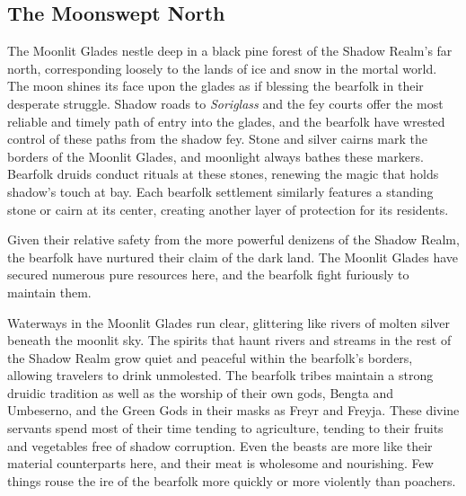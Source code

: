 \documentclass[10pt,a4paper,twoside,bg=print,twocolumn,openany,nodeprecatedcode]{dndbook}
\begin{document}
\subsection{The Moonswept North}
The Moonlit Glades nestle deep in a black pine forest of the Shadow Realm's far north, corresponding loosely to the lands of ice and snow in the mortal world. The moon shines its face upon the glades as if blessing the bearfolk in their desperate struggle. Shadow roads to \textit{Soriglass} and the fey courts offer the most reliable and timely path of entry into the glades, and the bearfolk have wrested control of these paths from the shadow fey. Stone and silver cairns mark the borders of the Moonlit Glades, and moonlight always bathes these markers. Bearfolk druids conduct rituals at these stones, renewing the magic that holds shadow's touch at bay. Each bearfolk settlement similarly features a standing stone or cairn at its center, creating another layer of protection for its residents.

Given their relative safety from the more powerful denizens of the Shadow Realm, the bearfolk have nurtured their claim of the dark land. The Moonlit Glades have secured numerous pure resources here, and the bearfolk fight furiously to maintain them.

Waterways in the Moonlit Glades run clear, glittering like rivers of molten silver beneath the moonlit sky. The spirits that haunt rivers and streams in the rest of the Shadow Realm grow quiet and peaceful within the bearfolk's borders, allowing travelers to drink unmolested. The bearfolk tribes maintain a strong druidic tradition as well as the worship of their own gods, Bengta and Umbeserno, and the Green Gods in their masks as Freyr and Freyja. These divine servants spend most of their time tending to agriculture, tending to their fruits and vegetables free of shadow corruption. Even the beasts are more like their material counterparts here, and their meat is wholesome and nourishing. Few things rouse the ire of the bearfolk more quickly or more violently than poachers.
\end{document}
